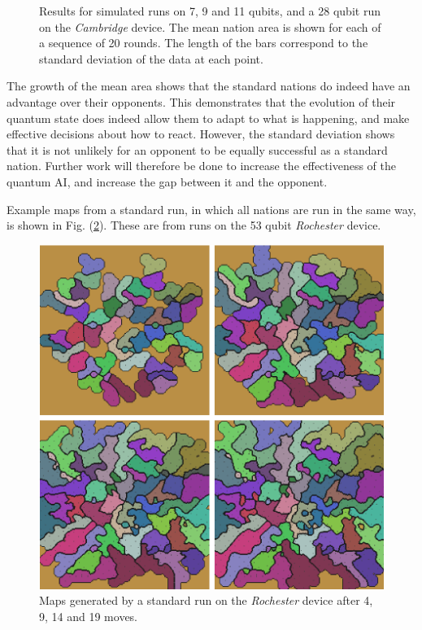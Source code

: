 \documentclass[conference]{IEEEtran}
\begin{document}
\begin{figure}[htbp]
\begin{center}
\caption{Results for simulated runs on 7, 9 and 11 qubits, and a 28 qubit run on the \textit{Cambridge} device. The mean nation area is shown for each of a sequence of 20 rounds. The length of the bars correspond to the standard deviation of the data at each point.}
\label{default}
\end{center}
\end{figure}

The growth of the mean area shows that the standard nations do indeed have an advantage over their opponents. This demonstrates that the evolution of their quantum state does indeed allow them to adapt to what is happening, and make effective decisions about how to react. However, the standard deviation shows that it is not unlikely for an opponent to be equally successful as a standard nation. Further work will therefore be done to increase the effectiveness of the quantum AI, and increase the gap between it and the opponent.

Example maps from a standard run, in which all nations are run in the same way, is shown in Fig. (\ref{maps}). These are from runs on the 53 qubit \textit{Rochester} device.

\begin{figure}[htbp]
\begin{center}
\includegraphics[width=0.95\columnwidth]{figures/maps.png}
\caption{Maps generated by a standard run on the \textit{Rochester} device after 4, 9, 14 and 19 moves.}
\label{maps}
\end{center}
\end{figure}
\end{document}
